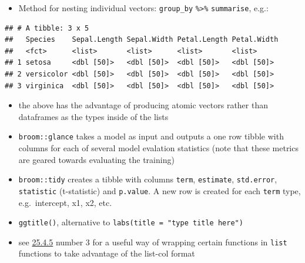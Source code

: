 \documentclass[]{book}
\newenvironment{Shaded}{\begin{snugshade}}{\end{snugshade}}
\newcommand{\DataTypeTok}[1]{\textcolor[rgb]{0.13,0.29,0.53}{#1}}
\newcommand{\DecValTok}[1]{\textcolor[rgb]{0.00,0.00,0.81}{#1}}
\newcommand{\KeywordTok}[1]{\textcolor[rgb]{0.13,0.29,0.53}{\textbf{#1}}}
\newcommand{\NormalTok}[1]{#1}
\newcommand{\OperatorTok}[1]{\textcolor[rgb]{0.81,0.36,0.00}{\textbf{#1}}}
\newcommand{\StringTok}[1]{\textcolor[rgb]{0.31,0.60,0.02}{#1}}
\providecommand{\tightlist}{%
  \setlength{\itemsep}{0pt}\setlength{\parskip}{0pt}}
\theoremstyle{definition}
\theoremstyle{definition}
\theoremstyle{definition}
\theoremstyle{remark}
\begin{document}
\begin{Shaded}
\end{Shaded}

\begin{itemize}
\tightlist
\item
  Method for nesting individual vectors: \texttt{group\_by}
  \texttt{\%\textgreater{}\%} \texttt{summarise}, e.g.:
\end{itemize}

\begin{Shaded}
\end{Shaded}

\begin{verbatim}
## # A tibble: 3 x 5
##   Species    Sepal.Length Sepal.Width Petal.Length Petal.Width
##   <fct>      <list>       <list>      <list>       <list>     
## 1 setosa     <dbl [50]>   <dbl [50]>  <dbl [50]>   <dbl [50]> 
## 2 versicolor <dbl [50]>   <dbl [50]>  <dbl [50]>   <dbl [50]> 
## 3 virginica  <dbl [50]>   <dbl [50]>  <dbl [50]>   <dbl [50]>
\end{verbatim}

\begin{itemize}
\tightlist
\item
  the above has the advantage of producing atomic vectors rather than
  dataframes as the types inside of the lists
\item
  \texttt{broom::glance} takes a model as input and outputs a one row
  tibble with columns for each of several model evalation statistics
  (note that these metrics are geared towards evaluating the training)
\item
  \texttt{broom::tidy} creates a tibble with columns \texttt{term},
  \texttt{estimate}, \texttt{std.error}, \texttt{statistic}
  (t-statistic) and \texttt{p.value}. A new row is created for each
  \texttt{term} type, e.g.~intercept, x1, x2, etc.
\item
  \texttt{ggtitle()}, alternative to
  \texttt{labs(title\ =\ "type\ title\ here")}
\item
  see \protect\hyperlink{section-89}{25.4.5} number 3 for a useful way
  of wrapping certain functions in \texttt{list} functions to take
  advantage of the list-col format
\end{itemize}
\end{document}
